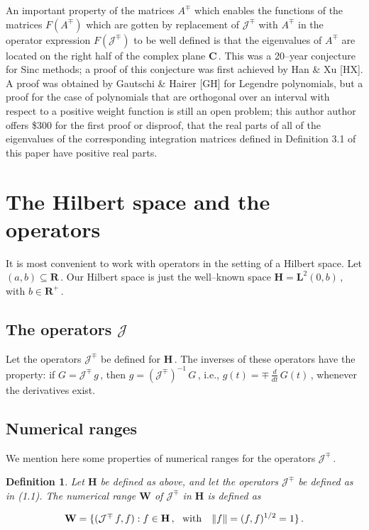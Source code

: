 \documentclass[11pt]{article}
\newtheorem{Definition}[Theorem]{Definition}
\begin{document}
\vspace{.2in} \noindent An important property of the matrices $A^\mp$
which enables the functions of the matrices $F(A^\mp)$ which are
gotten by replacement of ${\mathcal J}^\mp$ with $A^\mp$ in the
operator expression $F({\mathcal J}^\mp)$ to be well defined is that
the eigenvalues of $A^\mp$ are located on the right half of the
complex plane ${\mathbf C}$\,.  This was a 20--year conjecture for
Sinc methods; a proof of this conjecture was first achieved by Han \&
Xu [HX].  A proof was obtained by Gautschi \& Hairer [GH] for Legendre
polynomials, but a proof for the case of polynomials that are
orthogonal over an interval with respect to a positive weight function
is still an open problem; this author author offers \$300 for the
first proof or disproof, that the real parts of all of the eigenvalues
of the corresponding integration matrices defined in Definition 3.1 of
this paper have positive real parts.

\section{The Hilbert space and the operators}
\setcounter{equation}{0}

It is most convenient to work with operators in the setting of a
Hilbert space.  Let $(a,b) \subseteq {\mathbf R}$\,.  Our Hilbert
space is just the well--known space ${\mathbf H} = {\mathbf
  L}^2(0,b)$\,, with $b \in {\mathbf R}^+$\,.


\subsection{The operators ${\mathcal J}$}

Let the operators ${\mathcal J}^\mp$ be defined for ${\mathbf H}$\,.
The inverses of these operators have the property: if $G = {\mathcal
  J}^\mp\,g$\,, then $g = \left({\mathcal J}^\mp\right)^{-1}\,G$\,,
i.e., $g(t) = \mp \, \frac{d}{dt}\,G(t)$\,, whenever the derivatives
exist.

\subsection{Numerical ranges}

We mention here some properties of numerical ranges for the operators
${\mathcal J}^\mp$\,.

\begin{Definition}%
  \label{definition:2.1}
  Let ${\mathbf H}$ be defined as above, and let the
  operators ${\mathcal J}^\mp$ be defined as in (1.1).    The 
  numerical range ${\mathbf W}$ of ${\mathcal J}^\mp$ in 
  ${\mathbf H}$  is defined as

  \begin{equation}%
{\mathbf W} = \{({\mathcal J}^\mp\,f,f) : f \in {\mathbf H}\,, \ \ {\rm with}
\ \ \ \|f\| = (f,f)^{1/2} = 1\}\,.
\label{equation:2.1}
\end{equation}

\end{Definition}
\end{document}
